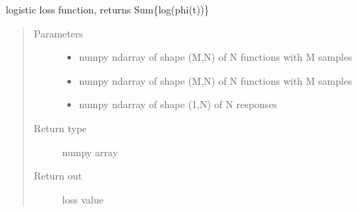 \documentclass[letterpaper,10pt,english]{sphinxmanual}
\begin{document}
\begin{fulllineitems}
\label{\detokenize{regression:regression.logit_loss}}
logistic loss function, returns Sum\{\sphinxhyphen{}log(phi(t))\}
\begin{quote}\begin{description}
\item[{Parameters}] \leavevmode\begin{itemize}
\item {} 
 \textendash{} numpy ndarray of shape (M,N) of N functions with M samples

\item {} 
 \textendash{} numpy ndarray of shape (M,N) of N functions with M samples

\item {} 
 \textendash{} numpy ndarray of shape (1,N) of N responses

\end{itemize}

\item[{Return type}] \leavevmode
numpy array

\item[{Return out}] \leavevmode
loss value

\end{description}\end{quote}

\end{fulllineitems}

\end{document}
